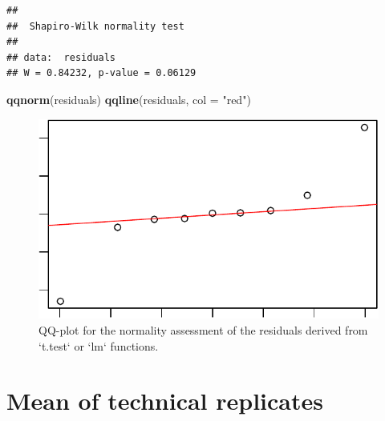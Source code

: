 \documentclass[
]{article}
\newenvironment{Shaded}{\begin{snugshade}}{\end{snugshade}}
\newcommand{\AttributeTok}[1]{\textcolor[rgb]{0.13,0.29,0.53}{#1}}
\newcommand{\DecValTok}[1]{\textcolor[rgb]{0.00,0.00,0.81}{#1}}
\newcommand{\FunctionTok}[1]{\textcolor[rgb]{0.13,0.29,0.53}{\textbf{#1}}}
\newcommand{\NormalTok}[1]{#1}
\newcommand{\OtherTok}[1]{\textcolor[rgb]{0.56,0.35,0.01}{#1}}
\newcommand{\SpecialCharTok}[1]{\textcolor[rgb]{0.81,0.36,0.00}{\textbf{#1}}}
\newcommand{\StringTok}[1]{\textcolor[rgb]{0.31,0.60,0.02}{#1}}
\begin{document}
\begin{Shaded}
\end{Shaded}

\begin{verbatim}
## 
##  Shapiro-Wilk normality test
## 
## data:  residuals
## W = 0.84232, p-value = 0.06129
\end{verbatim}

\begin{Shaded}
\begin{Highlighting}[]
\FunctionTok{qqnorm}\NormalTok{(residuals)}
\FunctionTok{qqline}\NormalTok{(residuals, }\AttributeTok{col =} \StringTok{"red"}\NormalTok{)}
\end{Highlighting}
\end{Shaded}

\begin{figure}

{\centering \includegraphics{vignette_files/figure-latex/unnamed-chunk-15-1} 

}

\caption{QQ-plot for the normality assessment of the residuals derived from `t.test` or `lm` functions.}\label{fig:unnamed-chunk-15}
\end{figure}

\hypertarget{mean-of-technical-replicates}{%
\section{Mean of technical
replicates}\label{mean-of-technical-replicates}}
\end{document}
